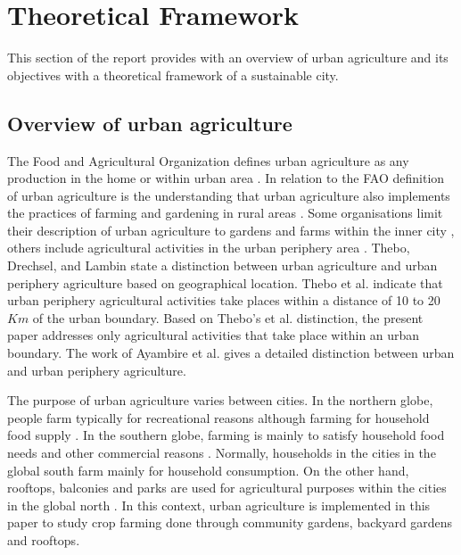 \chapter{Theoretical Framework} %

\label{Chapter:ConceptualFramework}

This section of the report provides with an overview of urban agriculture and its objectives with a theoretical framework of a sustainable city.

\section{Overview of urban agriculture}

The Food and Agricultural Organization defines urban agriculture as any production in the home or within urban area \cite{FAO2003}. In relation to the FAO definition of urban agriculture is the understanding that urban agriculture also implements the practices of farming and gardening in rural areas \cite{Opitz2016}. Some organisations limit their description of urban agriculture to gardens and farms within the inner city \cite{NewYorkN.Y..DepartmentofParksandRecreation.2010}, others include agricultural activities in the urban periphery area \cite{Mok2014}. Thebo, Drechsel, and Lambin \cite{Thebo2014} state a distinction between urban agriculture and urban periphery agriculture based on geographical location. Thebo et al. indicate that urban periphery agricultural activities take places within a distance of 10 to 20 $Km$ of the urban boundary. Based on Thebo's et al. distinction, the present paper addresses only agricultural activities that take place within an urban boundary. The work of Ayambire et al. \cite{Ayambire2019} gives a detailed distinction between urban and urban periphery agriculture.

The purpose of urban agriculture varies between cities. In the northern globe, people farm typically for recreational reasons although farming for household food supply \cite{McClintock2010}. In the southern globe, farming is mainly to satisfy household food needs and other commercial reasons \cite{Amponsah2016, McClintock2010}. Normally, households in the cities in the global south farm mainly for household consumption. On the other hand, rooftops, balconies and parks are used for agricultural purposes within the cities in the global north \cite{McClintock2010}. In this context, urban agriculture is implemented in this paper to study crop farming done through community gardens, backyard gardens and rooftops.

